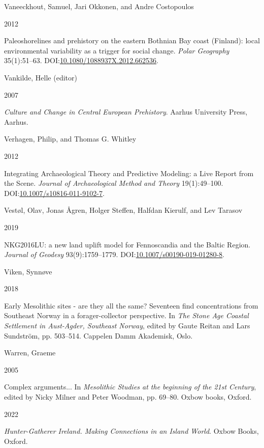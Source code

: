 \documentclass[
  12pt,
  a4paper,
  oneside]{book}
\newlength{\cslhangindent}
\newlength{\csllabelwidth}
\newlength{\cslentryspacingunit} %
\newenvironment{CSLReferences}[2] %
 {%
  \setlength{\parindent}{0pt}
  \ifodd #1
  \let\oldpar\par
  \def\par{\hangindent=\cslhangindent\oldpar}
  \fi
  \setlength{\parskip}{#2\cslentryspacingunit}
 }%
 {}
\newcommand{\CSLBlock}[1]{#1\hfill\break}
\newcommand{\CSLLeftMargin}[1]{\parbox[t]{\csllabelwidth}{#1}}
\newcommand{\CSLRightInline}[1]{\parbox[t]{\linewidth - \csllabelwidth}{#1}\break}
\begin{document}
\begin{CSLReferences}{0}{0}
\leavevmode{}%
\CSLBlock{Vaneeckhout, Samuel, Jari Okkonen, and Andre Costopoulos}
\CSLLeftMargin{ 2012}
\CSLRightInline{{Paleoshorelines and prehistory on the eastern Bothnian Bay coast (Finland): local environmental variability as a trigger for social change}. \emph{Polar Geography} 35(1):51--63. DOI:\href{https://doi.org/10.1080/1088937X.2012.662536}{10.1080/1088937X.2012.662536}.}

\leavevmode{}%
\CSLBlock{Vankilde, Helle (editor)}
\CSLLeftMargin{ 2007}
\CSLRightInline{\emph{{Culture and Change in Central European Prehistory}}. Aarhus University Press, Aarhus.}

\leavevmode{}%
\CSLBlock{Verhagen, Philip, and Thomas G. Whitley}
\CSLLeftMargin{ 2012}
\CSLRightInline{{Integrating Archaeological Theory and Predictive Modeling: a Live Report from the Scene}. \emph{Journal of Archaeological Method and Theory} 19(1):49--100. DOI:\href{https://doi.org/10.1007/s10816-011-9102-7}{10.1007/s10816-011-9102-7}.}

\leavevmode{}%
\CSLBlock{Vestøl, Olav, Jonas Ågren, Holger Steffen, Halfdan Kierulf, and Lev Tarasov}
\CSLLeftMargin{ 2019}
\CSLRightInline{{NKG2016LU: a new land uplift model for Fennoscandia and the Baltic Region}. \emph{Journal of Geodesy} 93(9):1759--1779. DOI:\href{https://doi.org/10.1007/s00190-019-01280-8}{10.1007/s00190-019-01280-8}.}

\leavevmode{}%
\CSLBlock{Viken, Synnøve}
\CSLLeftMargin{ 2018}
\CSLRightInline{{Early Mesolithic sites - are they all the same? Seventeen find concentrations from Southeast Norway in a forager-collector perspective}. In \emph{{The Stone Age Coastal Settlement in Aust-Agder, Southeast Norway}}, edited by Gaute Reitan and Lars Sundström, pp. 503--514. Cappelen Damm Akademisk, Oslo.}

\leavevmode{}%
\CSLBlock{Warren, Graeme}
\CSLLeftMargin{ 2005}
\CSLRightInline{{Complex arguments...} In \emph{{Mesolithic Studies at the beginning of the 21st Century}}, edited by Nicky Milner and Peter Woodman, pp. 69--80. Oxbow books, Oxford.}

\leavevmode{}%
\CSLLeftMargin{ 2022 }
\CSLRightInline{\emph{{Hunter-Gatherer Ireland. Making Connections in an Island World}}. Oxbow Books, Oxford.}


\end{CSLReferences}
\end{document}

